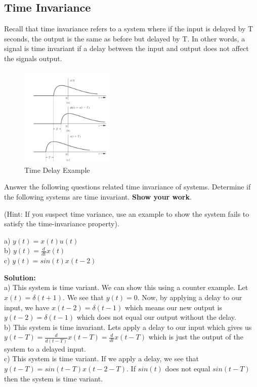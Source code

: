 \documentclass[12pt]{article}
\newenvironment{solution}{\vspace{2mm}\color{blue}\textbf{Solution: }}{\color{black}}
\begin{document}
\begin{enumerate}[\qquad 1)]
\subsection*{Time Invariance}

Recall that time invariance refers to a system where if the input is delayed by T seconds, the output is the same as before but delayed by T. In other words, a signal is time invariant if a delay between the input and output does not affect the signals output.

\begin{figure}[htbp]
    \centering
    \includegraphics[width=0.4\textwidth]{images/TimeInvariance.png}
    \caption{Time Delay Example}
    \label{fig:Problem5}
\end{figure} 
    
Answer the following questions related time invariance of systems. Determine if the following systems are time invariant.  \textbf{Show your work}.

(Hint: If you suspect time variance, use an example to show the system fails to satisfy the time-invariance property).

a) $y(t) = x(t)u(t)$\\

b) $y(t) = \frac{d}{dt}x(t)$\\

c) $y(t) = sin(t)x(t-2)$

\begin{solution}
    \\
    a) This system is time variant. We can show this using a counter example. Let $x(t) = \delta(t + 1)$. We see that $y(t) = 0$. Now, by applying a delay to our input, we have $x(t-2) = \delta(t - 1)$ which means our new output is $y(t-2) = \delta(t-1)$ which does not equal our output without the delay. 
    \\
    b) This system is time invariant. Lets apply a delay to our input which gives us $y(t-T) = \frac{d}{d(t-T)}x(t-T) = \frac{d}{dt}x(t-T)$ which is just the output of the system to a delayed input.
    \\
    c) This system is time variant. If we apply a delay, we see that $y(t-T) = sin(t-T)x(t-2-T)$. If $sin(t)$ does not equal $sin(t-T)$ then the system is time variant. 
\end{solution}


\end{enumerate}
\end{document}
